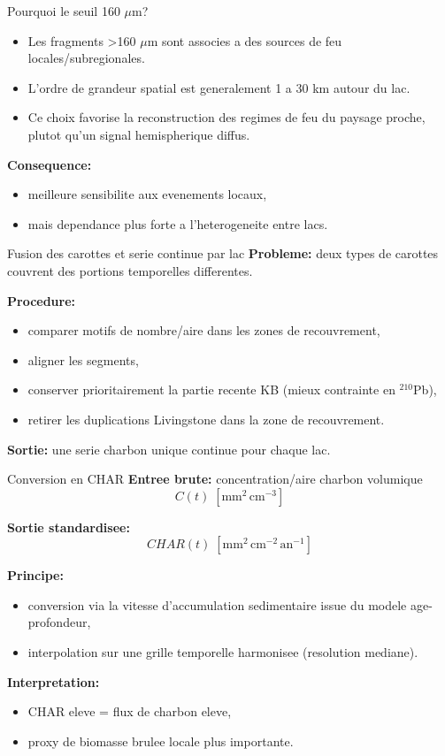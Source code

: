 \documentclass[aspectratio=169,11pt]{beamer}
\begin{document}
\begin{frame}{Pourquoi le seuil 160 \(\mu\)m?}
\begin{itemize}
  \item Les fragments >160 \(\mu\)m sont associes a des sources de feu locales/subregionales.
  \item L'ordre de grandeur spatial est generalement \alert{1 a 30 km} autour du lac.
  \item Ce choix favorise la reconstruction des regimes de feu du paysage proche,
        plutot qu'un signal hemispherique diffus.
\end{itemize}

\vspace{0.2cm}
\textbf{Consequence:}
\begin{itemize}
  \item meilleure sensibilite aux evenements locaux,
  \item mais dependance plus forte a l'heterogeneite entre lacs.
\end{itemize}
\end{frame}

\begin{frame}{Fusion des carottes et serie continue par lac}
\textbf{Probleme:} deux types de carottes couvrent des portions temporelles differentes.

\textbf{Procedure:}
\begin{itemize}
  \item comparer motifs de nombre/aire dans les zones de recouvrement,
  \item aligner les segments,
  \item conserver prioritairement la partie recente KB (mieux contrainte en \(^{210}\)Pb),
  \item retirer les duplications Livingstone dans la zone de recouvrement.
\end{itemize}

\textbf{Sortie:} une serie charbon unique continue pour chaque lac.
\end{frame}

\begin{frame}{Conversion en CHAR}
\textbf{Entree brute:} concentration/aire charbon volumique
\[
C(t) \; [\mathrm{mm}^2\,\mathrm{cm}^{-3}]
\]

\textbf{Sortie standardisee:}
\[
CHAR(t) \; [\mathrm{mm}^2\,\mathrm{cm}^{-2}\,\mathrm{an}^{-1}]
\]

\textbf{Principe:}
\begin{itemize}
  \item conversion via la vitesse d'accumulation sedimentaire issue du modele age-profondeur,
  \item interpolation sur une grille temporelle harmonisee (resolution mediane).
\end{itemize}

\textbf{Interpretation:}
\begin{itemize}
  \item CHAR eleve = flux de charbon eleve,
  \item proxy de biomasse brulee locale plus importante.
\end{itemize}
\end{frame}
\end{document}
